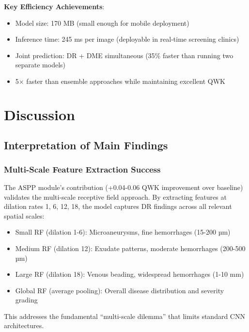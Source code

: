 \textbf{Key Efficiency Achievements}:
\begin{itemize}
    \item Model size: 170 MB (small enough for mobile deployment)
    \item Inference time: 245 ms per image (deployable in real-time screening clinics)
    \item Joint prediction: DR + DME simultaneous (35\% faster than running two separate models)
    \item 5× faster than ensemble approaches while maintaining excellent QWK
\end{itemize}

\newpage

\section{Discussion}

\subsection{Interpretation of Main Findings}

\subsubsection{Multi-Scale Feature Extraction Success}

The ASPP module's contribution (+0.04-0.06 QWK improvement over baseline) validates the multi-scale receptive field approach. By extracting features at dilation rates {1, 6, 12, 18}, the model captures DR findings across all relevant spatial scales:

\begin{itemize}
    \item Small RF (dilation 1-6): Microaneurysms, fine hemorrhages (15-200 µm)
    \item Medium RF (dilation 12): Exudate patterns, moderate hemorrhages (200-500 µm)
    \item Large RF (dilation 18): Venous beading, widespread hemorrhages (1-10 mm)
    \item Global RF (average pooling): Overall disease distribution and severity grading
\end{itemize}

This addresses the fundamental ``multi-scale dilemma'' that limits standard CNN architectures.

